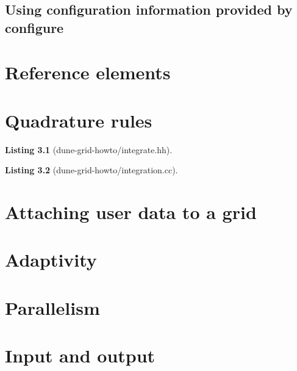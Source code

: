 \documentclass[11pt,a4paper,headinclude,footinclude,DIV14,BCOR8.25mm,titlepage,twoside,openright,normalheadings]{scrreprt}
\newtheorem{lst}{Listing}
\begin{document}
\section{Using configuration information provided by configure}



\chapter{Reference elements}

\chapter{Quadrature rules}

\begin{lst}[dune-grid-howto/integrate.hh] \mbox{}


\end{lst}

\begin{lst}[dune-grid-howto/integration.cc] \mbox{}


\end{lst}


\chapter{Attaching user data to a grid}

\chapter{Adaptivity}

\chapter{Parallelism}

\chapter{Input and output}








\printindex
\end{document}
